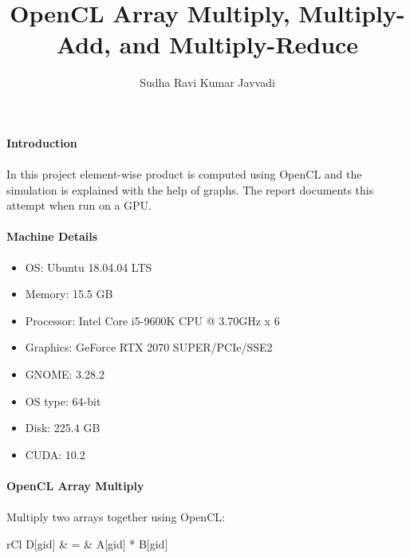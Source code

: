 \documentclass[notitlepage]{report}
\title{OpenCL Array Multiply, Multiply-Add, and Multiply-Reduce}
\author{Sudha Ravi Kumar Javvadi}
\begin{document}
	\maketitle
	
	\paragraph{Introduction}
	\paragraph{} In this project element-wise product is computed using OpenCL and the simulation is explained with the help of graphs. The report documents this attempt when run on a GPU.
	
	\paragraph{Machine Details}
	\begin{itemize}
		\item{OS}: Ubuntu 18.04.04 LTS
		\item{Memory}: 15.5 GB
		\item{Processor}: Intel Core i5-9600K CPU @ 3.70GHz x 6
		\item{Graphics}: GeForce RTX 2070 SUPER/PCIe/SSE2
		\item{GNOME}: 3.28.2
		\item{OS type}: 64-bit
		\item{Disk}: 225.4 GB
		\item{CUDA}: 10.2
	\end{itemize}

	\paragraph{OpenCL Array Multiply}
	\paragraph{} Multiply two arrays together using OpenCL:
	\begin{IEEEeqnarray*}{rCl}
		D[gid] & = & A[gid] * B[gid]
	\end{IEEEeqnarray*}
\end{document}
